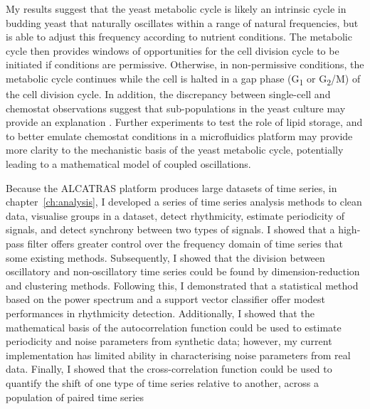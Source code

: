 My results suggest that the yeast metabolic cycle is likely an intrinsic cycle in budding yeast that naturally oscillates within a range of natural frequencies, but is able to adjust this frequency according to nutrient conditions.
The metabolic cycle then provides windows of opportunities for the cell division cycle to be initiated if conditions are permissive.
Otherwise, in non-permissive conditions, the metabolic cycle continues while the cell is halted in a gap phase (G\textsubscript{1} or G\textsubscript{2}/M) of the cell division cycle.
In addition, the discrepancy between single-cell and chemostat observations suggest that sub-populations in the yeast culture may provide an explanation \parencite{burnettiCellCycleStart2016}.
Further experiments to test the role of lipid storage, and to better emulate chemostat conditions in a microfluidics platform may provide more clarity to the mechanistic basis of the yeast metabolic cycle, potentially leading to a mathematical model of coupled oscillations.

Because the ALCATRAS platform produces large datasets of time series, in chapter~\ref{ch:analysis}, I developed a series of time series analysis methods to clean data, visualise groups in a dataset, detect rhythmicity, estimate periodicity of signals, and detect synchrony between two types of signals.
I showed that a high-pass filter offers greater control over the frequency domain of time series that some existing methods.
Subsequently, I showed that the division between oscillatory and non-oscillatory time series could be found by dimension-reduction and clustering methods.
Following this, I demonstrated that a statistical method based on the power spectrum and a support vector classifier offer modest performances in rhythmicity detection.
Additionally, I showed that the mathematical basis of the autocorrelation function could be used to estimate periodicity and noise parameters from synthetic data; however, my current implementation has limited ability in characterising noise parameters from real data.
Finally, I showed that the cross-correlation function could be used to quantify the shift of one type of time series relative to another, across a population of paired time series


